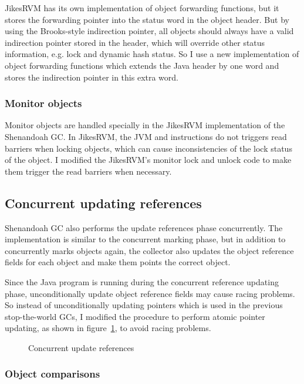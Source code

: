 JikesRVM has its own implementation of object forwarding functions, but it stores the forwarding
pointer into the status word in the object header. But by using the Brooks-style indirection
pointer, all objects should always have a valid indirection pointer stored in the header, which will override other status
information, e.g. lock and dynamic hash status. So I use a new implementation of
object forwarding functions which extends the Java header by one word and stores the indirection
pointer in this extra word.

\subsubsection{Monitor objects}

Monitor objects are handled specially in the JikesRVM implementation of the Shenandoah GC.
In JikesRVM, the JVM  and  instructions
do not triggers read barriers when locking objects, which can cause inconsistencies 
of the lock status of the object. I modified the JikesRVM's monitor lock and unlock
code to make them trigger the read barriers when necessary.

\subsection{Concurrent updating references}

Shenandoah GC also performs the update references phase concurrently.
The implementation is similar to the concurrent marking phase, but in addition to
concurrently marks objects again, the collector also updates the object reference fields
for each object and make them points the correct object.

Since the Java program is running during the concurrent reference updating phase,
unconditionally update object reference fields may cause racing problems. So instead of
unconditionally updating pointers which is used in the previous stop-the-world GCs,
I modified the procedure to perform
atomic pointer updating, as shown in figure~\ref{fig:concupdaterefs},
to avoid racing problems.

\begin{figure}
  \centering
  
  \caption{Concurrent update references}
  \label{fig:concupdaterefs}
\end{figure}

\subsubsection{Object comparisons}

